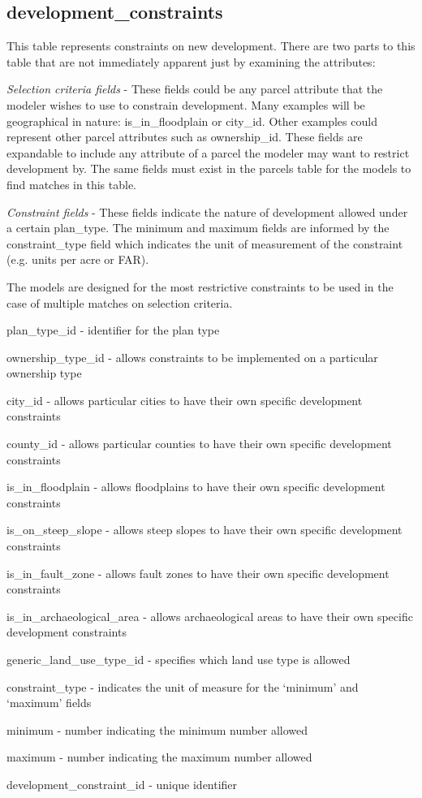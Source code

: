\subsection{development\_constraints} 

This table represents constraints on new development. There are two parts to this table that are not immediately apparent just by examining the attributes:

\emph{Selection criteria fields} - These fields could be any parcel attribute that the modeler wishes to use to constrain development. Many examples will be geographical in nature: is\_in\_floodplain or city\_id. Other examples could represent other parcel attributes such as ownership\_id. These fields are expandable to include any attribute of a parcel the modeler may want to restrict development by. The same fields must exist in the parcels table for the models to find matches in this table.

\emph{Constraint fields} - These fields indicate the nature of development allowed under a certain plan\_type. The minimum and maximum fields are informed by the constraint\_type field which indicates the unit of measurement of the constraint (e.g. units per acre or FAR). 

The models are designed for the most restrictive constraints to be used in the case of multiple matches on selection criteria.

\begin{description}
\item plan\_type\_id - identifier for the plan type
\item ownership\_type\_id - allows constraints to be implemented on a particular ownership type
\item city\_id - allows particular cities to have their own specific development constraints
\item county\_id - allows particular counties to have their own specific development constraints
\item is\_in\_floodplain - allows floodplains to have their own specific development constraints
\item is\_on\_steep\_slope - allows steep slopes to have their own specific development constraints
\item is\_in\_fault\_zone - allows fault zones to have their own specific development constraints
\item is\_in\_archaeological\_area - allows archaeological areas to have their own specific development constraints 
\item generic\_land\_use\_type\_id - specifies which land use type is allowed
\item constraint\_type - indicates the unit of measure for the `minimum' and `maximum' fields
\item minimum - number indicating the minimum number allowed
\item maximum - number indicating the maximum number allowed 
\item development\_constraint\_id - unique identifier 
\end{description}

